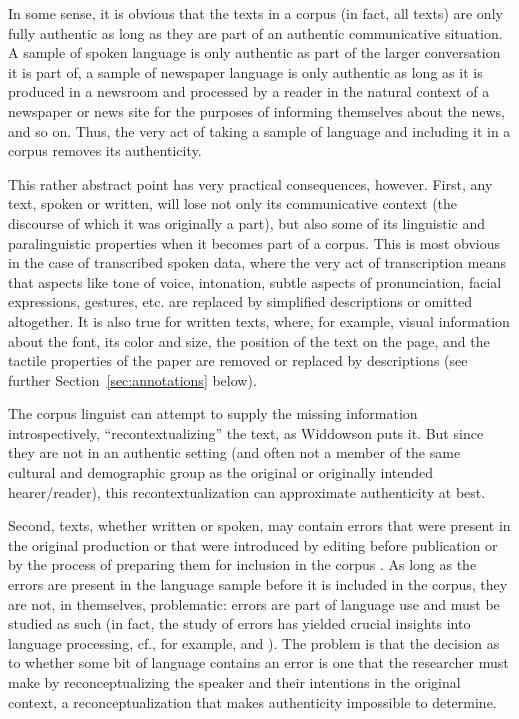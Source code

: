 In some sense, it is obvious that the texts in a corpus (in fact, all texts) are only fully authentic  as long as they are part of an authentic communicative situation. A sample  of spoken  language is only authentic  as part of the larger conversation  it is part of, a sample of newspaper  language is only authentic as long as it is produced in a newsroom and processed by a reader in the natural context of a newspaper or news site for the purposes of informing themselves about the news, and so on. Thus, the very act of taking a sample of language and including it in a corpus removes its  authenticity.

This rather abstract point has very practical consequences, however. First, any text, spoken  or written, will lose not only its communicative context (the discourse of which it was originally a part), but also some of its linguistic and paralinguistic  properties when it becomes part of a corpus. This is most obvious in the case of transcribed  spoken data, where the very act of transcription means that aspects like tone of voice, intonation,  subtle aspects of pronunciation,  facial expressions, gestures, etc. are replaced by simplified descriptions or omitted altogether. It is also true for written  texts, where, for example, visual information about the font, its color and size, the position of the text on the page, and the tactile properties of the paper are removed or replaced by descriptions (see further Section~\ref{sec:annotations} below).

The corpus linguist can attempt to supply the missing information introspectively,  ``recontextualizing'' the text, as Widdowson puts it. But since they are not in an authentic  setting (and often not a member of the same cultural  and demographic  group as the original or originally intended hearer\slash reader), this recontextualization can approximate authenticity  at best.

Second, texts, whether written  or spoken, may contain errors that were pres\-ent in the original production or that were introduced by editing before publication or by the process of preparing them for inclusion in the corpus \citep[cf. also][]{emons_corpus_1997}. As long as the errors are present in the language sample  before it is included in the corpus, they are not, in themselves, problematic: errors are part of language use and must be studied as such (in fact, the study of errors has yielded crucial insights into language processing, cf., for example, \citealt{fromkin_speech_1973} and \citealt{fromkin_errors_1980}). The problem is that the decision as to whether some bit of language contains an error is one that the researcher must make by reconceptualizing the speaker and their intentions in the original context, a reconceptualization that makes authenticity  impossible to determine.

